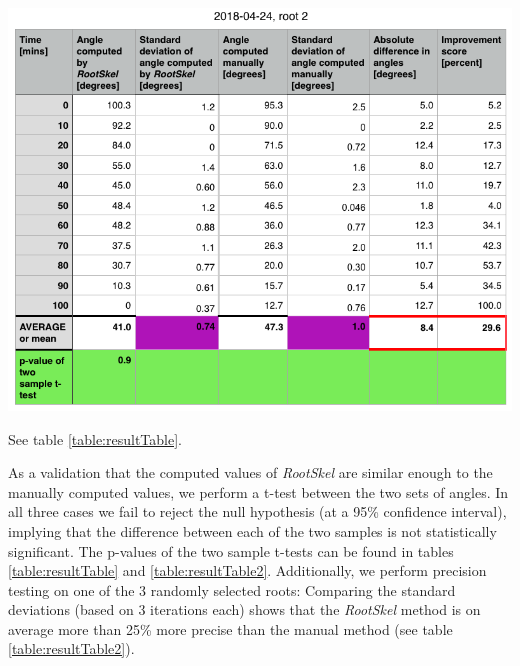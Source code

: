 \begin{table}[H]
	\includegraphics[width=\textwidth]{../Figures/2018-04-24-stats-new-stdv.png}
	\caption{See table \ref*{table:resultTable}.}
	\label{table:resultTable2}
\end{table}

As a validation that the computed values of \textit{RootSkel} are similar enough to the manually computed values, we perform a t-test between the two sets of angles.
In all three cases we fail to reject the null hypothesis (at a 95\% confidence interval), implying that the difference between each of the two samples is not statistically significant. The p-values of the two sample t-tests can be found in tables \ref{table:resultTable} and \ref{table:resultTable2}.
Additionally, we perform precision testing on one of the 3 randomly selected roots: Comparing the standard deviations (based on 3 iterations each) shows that the \textit{RootSkel} method is on average more than 25\% more precise than the manual method (see table \ref{table:resultTable2}).





